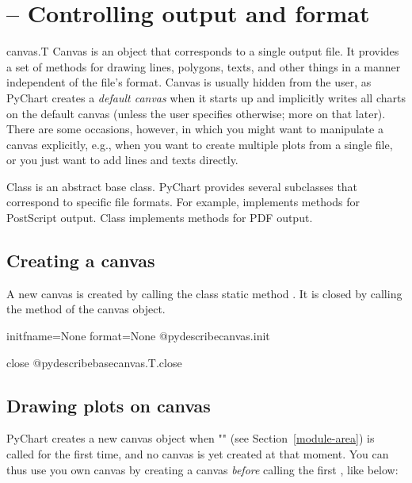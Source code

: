 \documentclass{howto}
\newcommand{\pychart}{PyChart}
\newcommand{\pxref}[1]{see Section~\ref{#1}}
\begin{document}
\section{ -- Controlling output and format}

\begin{classdesc*}{canvas.T}
Canvas is an object that corresponds to a single output file. It
provides a set of methods for drawing lines, polygons, texts, and other
things in a manner independent of the file's format.  Canvas is usually
hidden from the user, as \pychart{} creates a \emph{default canvas} when it
starts up and implicitly writes all charts on the default canvas (unless
the user specifies otherwise; more on that later). There are some
occasions, however, in which you might want to manipulate a canvas
explicitly, e.g., when you want to create multiple plots from a single
file, or you just want to add lines and texts directly.

Class  is an abstract base class. \pychart{} provides several
subclasses that correspond to specific file formats. For example,
 implements methods for PostScript output. Class
 implements methods for PDF output.
\end{classdesc*}

\subsection{Creating a canvas}\label{creating-canvas}

A new canvas is created by calling the class static method
. It is closed by
calling the  method of the canvas object.

\begin{funcdesc}{init}{fname=None format=None}
@pydescribe{canvas.init}
\end{funcdesc}

\begin{methoddesc}{close}{}
@pydescribe{basecanvas.T.close}
\end{methoddesc}


\subsection{Drawing plots on canvas}\label{drawing-graph-canvas}
\pychart{} creates a new canvas object when ""
(\pxref{module-area}) is called for the first time, and no canvas is yet
created at that moment.  You can thus use you own canvas by creating a
canvas \emph{before} calling the first , like below:
\end{document}

